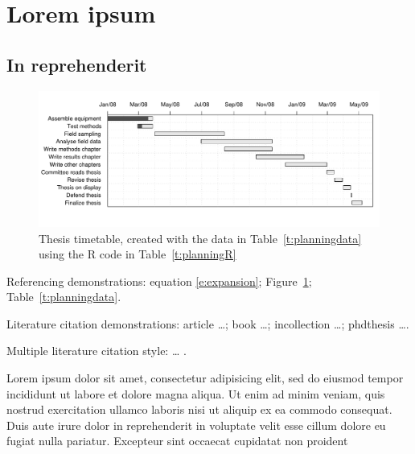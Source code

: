 \documentclass{thesis_proposal}
\begin{document}
\mainmatter                     %

%

\section{Lorem ipsum}

\subsection{In reprehenderit}

\begin{figure}[t]
  \begin{center}
    \includegraphics[width=\hsize]{planning} %
  \end{center}
  \caption[Research timetable.]{\label{f:planning}Thesis timetable, created
  with the data in Table~\ref{t:planningdata} using the R code in Table~\ref{t:planningR}}
\end{figure}

Referencing demonstrations:
equation \eqref{e:expansion};
Figure~\ref{f:planning};
Table~\ref{t:planningdata}.

Literature citation demonstrations:
article \cite{Voss:2001} \dots \cite[]{Voss:2001};
book \cite{JeffreysJeffreys1972}  \dots \cite[]{JeffreysJeffreys1972};
incollection \cite{Marshall1985}  \dots\cite[]{Marshall1985};
phdthesis \cite{Michel:1974} \dots \cite[]{Michel:1974}.

Multiple literature citation style:
\cite{Voss:2001,Jahnke:1990} \dots
\cite[]{Voss:2001,Jahnke:1990}.

Lorem ipsum dolor sit amet, consectetur adipisicing elit, sed do
eiusmod tempor incididunt ut labore et dolore magna aliqua. Ut enim ad
minim veniam, quis nostrud exercitation ullamco laboris nisi ut
aliquip ex ea commodo consequat. Duis aute irure dolor in
reprehenderit in voluptate velit esse cillum dolore eu fugiat nulla
pariatur. Excepteur sint occaecat cupidatat non proident
\end{document}
